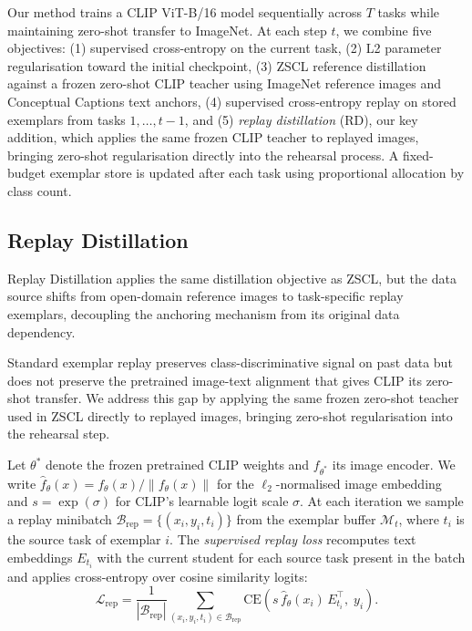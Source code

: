 \documentclass{article}
\begin{document}
  Our method trains a CLIP ViT-B/16 model sequentially across $T$ tasks while
  maintaining zero-shot transfer to ImageNet. At each step $t$, we combine five
  objectives: (1) supervised cross-entropy on the current task, (2) L2 parameter
  regularisation toward the initial checkpoint, (3) ZSCL reference distillation
  against a frozen zero-shot CLIP teacher using ImageNet reference images and
  Conceptual Captions text anchors, (4) supervised cross-entropy replay on stored
  exemplars from tasks $1, \ldots, t{-}1$, and (5) \emph{replay distillation}
  (RD), our key addition, which applies the same frozen CLIP teacher to replayed
  images, bringing zero-shot regularisation directly into the rehearsal process. A
  fixed-budget exemplar store is updated after each task using proportional
  allocation by class count.

  \subsection{Replay Distillation}
  
  \label{sec:method-rd}

  Replay Distillation applies the same distillation objective as ZSCL, but the
  data source shifts from open-domain reference images to task-specific replay
  exemplars, decoupling the anchoring mechanism from its original data dependency.

  Standard exemplar replay preserves class-discriminative signal on past data but
  does not preserve the pretrained image-text alignment that gives CLIP its
  zero-shot transfer. We address this gap by applying the same frozen zero-shot
  teacher used in ZSCL directly to replayed images, bringing zero-shot
  regularisation into the rehearsal step.

  Let $\theta^*$ denote the frozen pretrained CLIP weights and $f_{\theta^*}$ its
  image encoder. We write $\hat{f}_\theta(x) = f_\theta(x)/\|f_\theta(x)\|$ for
  the $\ell_2$-normalised image embedding and $s = \exp(\sigma)$ for CLIP's
  learnable logit scale $\sigma$. At each iteration we sample a replay minibatch
  $\mathcal{B}_{\text{rep}} = \{(x_i, y_i, t_i)\}$ from the exemplar buffer
  $\mathcal{M}_t$, where $t_i$ is the source task of exemplar $i$. The
  \emph{supervised replay loss} recomputes text embeddings $E_{t_i}$ with the
  current student for each source task present in the batch and applies
  cross-entropy over cosine similarity logits:
  \begin{equation}
    \mathcal{L}_{\text{rep}} = \frac{1}{|\mathcal{B}_{\text{rep}}|}
      \sum_{(x_i, y_i, t_i) \in \mathcal{B}_{\text{rep}}}
      \mathrm{CE}\!\left(s\,\hat{f}_{\theta}(x_i)\,E_{t_i}^\top,\; y_i\right).
  \end{equation}
\end{document}
